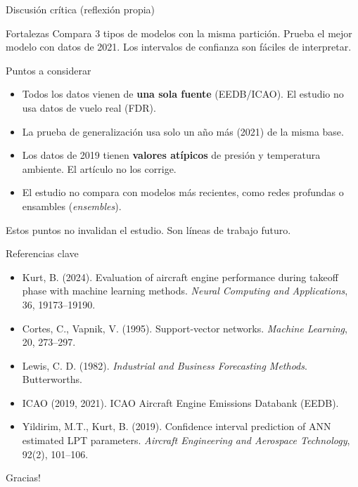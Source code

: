\documentclass{beamer}
\begin{document}
\begin{frame}{Discusión crítica (reflexión propia)}
    \justifying\small
    \begin{alertblock}{Fortalezas}
        Compara 3 tipos de modelos con la misma partición. Prueba el mejor modelo con datos de 2021. Los intervalos de confianza son fáciles de interpretar.
    \end{alertblock}
    \begin{block}{Puntos a considerar}
        \footnotesize
        \begin{itemize}
            \item Todos los datos vienen de \textbf{una sola fuente} (EEDB/ICAO). El estudio no usa datos de vuelo real (FDR).
            \item La prueba de generalización usa solo un año más (2021) de la misma base.
            \item Los datos de 2019 tienen \textbf{valores atípicos} de presión y temperatura ambiente. El artículo no los corrige.
            \item El estudio no compara con modelos más recientes, como redes profundas o ensambles (\textit{ensembles}).
        \end{itemize}
    \end{block}
    \footnotesize Estos puntos no invalidan el estudio. Son líneas de trabajo futuro.
\end{frame}

\begin{frame}{Referencias clave}
    \footnotesize
    \begin{itemize}
        \item Kurt, B. (2024). Evaluation of aircraft engine performance during takeoff phase with machine learning methods. \textit{Neural Computing and Applications}, 36, 19173--19190.
        \item Cortes, C., Vapnik, V. (1995). Support-vector networks. \textit{Machine Learning}, 20, 273--297.
        \item Lewis, C. D. (1982). \textit{Industrial and Business Forecasting Methods}. Butterworths.
        \item ICAO (2019, 2021). ICAO Aircraft Engine Emissions Databank (EEDB).
        \item Yildirim, M.T., Kurt, B. (2019). Confidence interval prediction of ANN estimated LPT parameters. \textit{Aircraft Engineering and Aerospace Technology}, 92(2), 101--106.
    \end{itemize}
\end{frame}

\begin{frame}
    \begin{center}
        {\Huge\calligra Gracias!}
    \end{center}
\end{frame}
\end{document}
